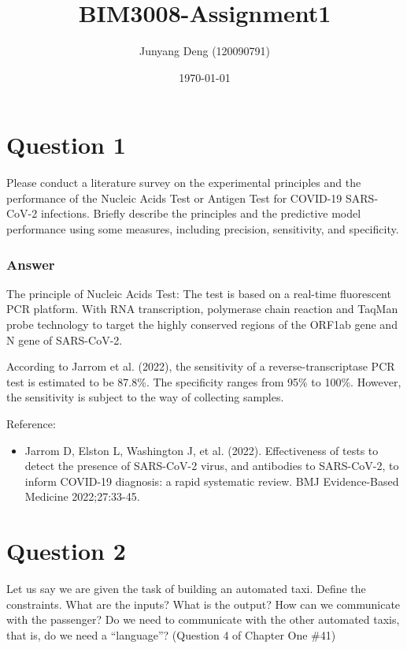 \documentclass{article}
\title{BIM3008-Assignment1}
\author{Junyang Deng (120090791)}
\date{\today}
\begin{document}
 
\maketitle
\section*{Question 1}
Please conduct a literature survey on the experimental principles and the performance of the Nucleic Acids Test or Antigen Test for COVID-19 SARS-CoV-2 infections. Briefly describe the principles and the predictive model performance using some measures, including precision, sensitivity, and specificity.
\subsubsection*{Answer}
The principle of Nucleic Acids Test: The test is based on a real-time fluorescent PCR platform. With RNA transcription, polymerase chain reaction and TaqMan probe technology to target the highly conserved regions of the ORF1ab gene and N gene of SARS-CoV-2. 

According to Jarrom et al. (2022), the sensitivity of a reverse-transcriptase PCR test is estimated to be 87.8\%.  The specificity ranges from 95\% to 100\%. However, the sensitivity is subject to the way of collecting samples.

Reference:
\begin{itemize}
    \item Jarrom D, Elston L, Washington J, et al. (2022). Effectiveness of tests to detect the presence of SARS-CoV-2 virus, and antibodies to SARS-CoV-2, to inform COVID-19 diagnosis: a rapid systematic review. BMJ Evidence-Based Medicine 2022;27:33-45.
\end{itemize}





\section*{Question 2}
Let us say we are given the task of building an automated taxi. Define the constraints. What are the inputs? What is the output? How can we communicate with the passenger? Do we need to communicate with the other automated taxis, that is, do we need a “language”? (Question 4 of Chapter One \#41)
\end{document}
